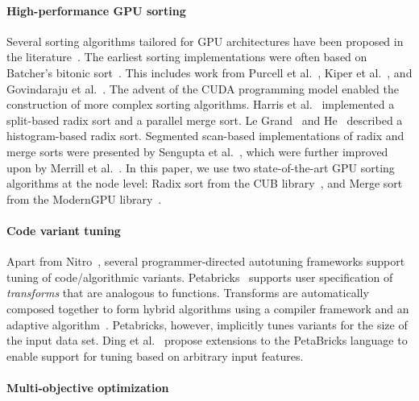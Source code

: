\paragraph{High-performance GPU sorting}
Several sorting algorithms tailored for GPU architectures have been proposed
in the literature~\cite{}. The earliest sorting implementations were often
based on Batcher's bitonic sort~\cite{}. This includes work from Purcell et al.~\cite{},
Kiper et al.~\cite{}, and Govindaraju et al.~\cite{}. The advent of the CUDA programming model
enabled the construction of more complex sorting algorithms. Harris et al.~\cite{} implemented
a split-based radix sort and a parallel merge sort. Le Grand~\cite{} and He~\cite{} described a
histogram-based radix sort. Segmented scan-based implementations of radix and merge sorts were
presented by Sengupta et al.~\cite{}, which were further improved upon by Merrill et al.~\cite{}.
In this paper, we use two state-of-the-art GPU sorting algorithms at the
node level: Radix sort from the CUB library~\cite{}, and Merge sort from the ModernGPU library~\cite{}.

\paragraph{Code variant tuning}
Apart from Nitro~\cite{muralidharan:2014},
several programmer-directed autotuning frameworks support
tuning of code/algorithmic variants.
Petabricks~\cite{PetaBricks} 
supports user specification of \textit{transforms} that
are analogous to functions. Transforms are automatically
composed together to form hybrid algorithms using a compiler
framework and an adaptive algorithm~\cite{increa11}. Petabricks, however,
implicitly tunes variants for the size of the input data set. Ding et
al.~\cite{ding:2015} propose extensions to the PetaBricks language to
enable support for tuning based on arbitrary input features.

\paragraph{Multi-objective optimization}
